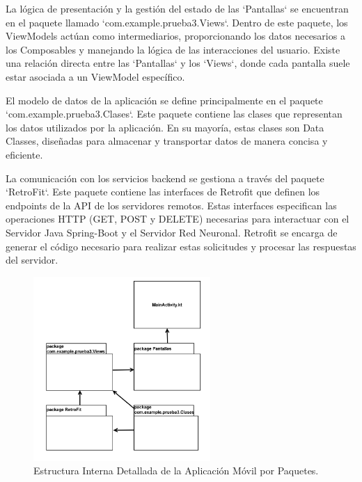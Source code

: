 La lógica de presentación y la gestión del estado de las `Pantallas` se encuentran en el paquete llamado `com.example.prueba3.Views`. Dentro de este paquete, los ViewModels actúan como intermediarios, proporcionando los datos necesarios a los Composables y manejando la lógica de las interacciones del usuario. Existe una relación directa entre las `Pantallas` y los `Views`, donde cada pantalla suele estar asociada a un ViewModel específico. 

El modelo de datos de la aplicación se define principalmente en el paquete `com.example.prueba3.Clases`. Este paquete contiene las clases que representan los datos utilizados por la aplicación. En su mayoría, estas clases son Data Classes, diseñadas para almacenar y transportar datos de manera concisa y eficiente.

La comunicación con los servicios backend se gestiona a través del paquete `RetroFit`. Este paquete contiene las interfaces de Retrofit que definen los endpoints de la API de los servidores remotos. Estas interfaces especifican las operaciones HTTP (GET, POST y DELETE) necesarias para interactuar con el Servidor Java Spring-Boot y el Servidor Red Neuronal. Retrofit se encarga de generar el código necesario para realizar estas solicitudes y procesar las respuestas del servidor.

\newpage

\begin{figure}[htbp!]
	\begin{center}
		\includegraphics[width=0.6\textwidth]{DiagramasMoviles/DCM (1)}
		\caption{Estructura Interna Detallada de la Aplicación Móvil por Paquetes.}
		\label{fig:Diagrama_app_movil_detallado}
	\end{center}
\end{figure}



